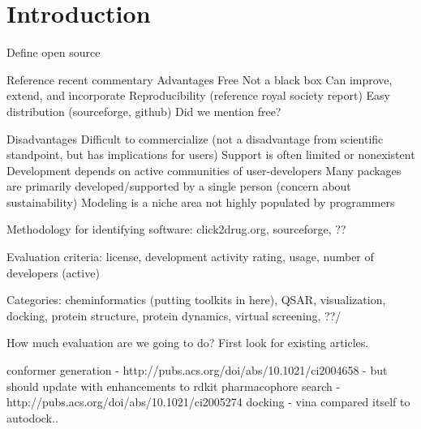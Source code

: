 \cite{Karthikeyan_2014}\section*{Introduction}

Define open source

Reference recent commentary \cite{Gezelter_2015}\cite{Krylov_2015}
Advantages 
Free
Not a black box 
Can improve, extend, and incorporate
Reproducibility (reference royal society report)
Easy distribution (sourceforge, github)
Did we mention free?

Disadvantages
Difficult to commercialize (not a disadvantage from scientific standpoint, but has implications for users)
Support is often limited or nonexistent 
Development depends on active communities of user-developers 
Many packages are primarily developed/supported by a single person (concern about sustainability)
Modeling is a niche area not highly populated by programmers

Methodology for identifying software: click2drug.org, sourceforge, ??

Evaluation criteria: license, development activity rating, usage, number of developers (active)

Categories:
 cheminformatics (putting toolkits in here), QSAR, visualization, docking, protein structure, protein dynamics, virtual screening, ??/
 
 
 How much evaluation are we going to do?  First look for existing articles.
 
 conformer generation - http://pubs.acs.org/doi/abs/10.1021/ci2004658 - but should update with enhancements to rdkit
 pharmacophore search - http://pubs.acs.org/doi/abs/10.1021/ci2005274
 docking - vina compared itself to autodock..
  
  
  \cite{Koes_2011}
  
